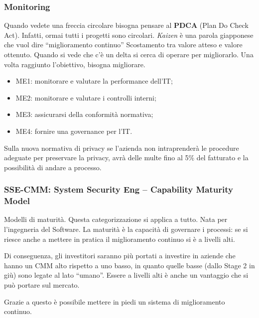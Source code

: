 \subsubsection{Monitoring} 
Quando vedete una freccia circolare bisogna pensare al \textbf{PDCA} (Plan Do 
Check Act). Infatti, ormai tutti i progetti sono circolari.  
\emph{Kaizen} è una parola giapponese che vuol dire ``miglioramento continuo''
Scostamento tra valore atteso e valore ottenuto. Quando si vede che c'è un delta 
si cerca di operare per migliorarlo.
Una volta raggiunto l'obiettivo, bisogna migliorare.

\begin{itemize}
\item ME1: monitorare e valutare la performance dell'IT;
\item ME2: monitorare e valutare i controlli interni;
\item ME3: assicurarsi della conformità normativa;
\item ME4: fornire una governance per l'IT.
\end{itemize}

Sulla nuova normativa di privacy se l'azienda non intraprenderà le procedure 
adeguate per preservare la privacy, avrà delle multe fino al 5\% del fatturato e 
la possibilità di andare a processo.

\subsubsection{SSE-CMM: System Security Eng -- Capability Maturity Model}

Modelli di maturità. Questa categorizzazione si applica a tutto. Nata per 
l'ingegneria del Software.
La maturità è la capacità di governare i processi: se si riesce anche a mettere 
in pratica il miglioramento continuo si è a livelli alti.

Di conseguenza, gli investitori saranno più portati a investire in aziende che hanno un CMM alto 
rispetto a uno basso, in quanto quelle basse (dallo Stage 2 in giù) sono legate 
al lato ``umano''. Essere a livelli alti è anche un vantaggio che si può portare 
sul mercato.

Grazie a questo è possibile mettere in piedi un sistema di miglioramento 
continuo.

